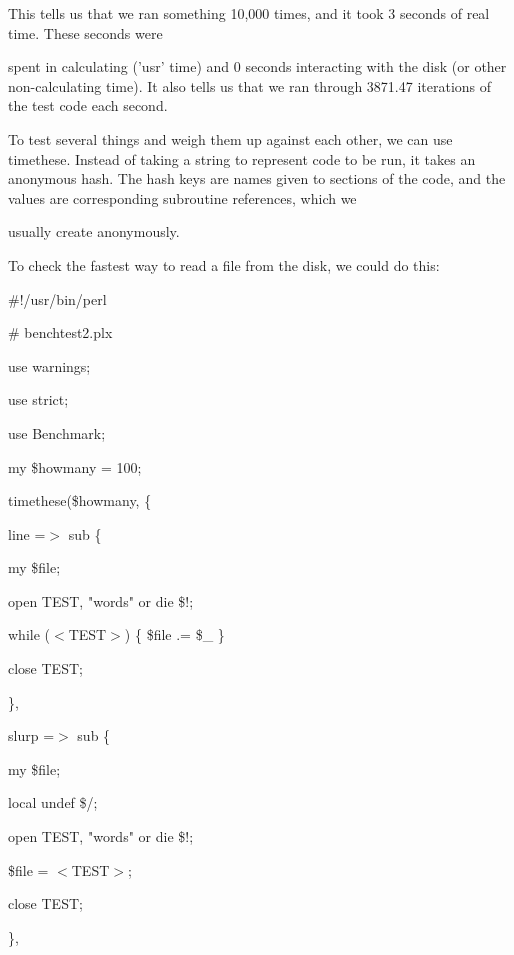 \documentclass[a4paper,11pt]{book}
\begin{document}
\noindent This tells us that we ran something 10,000 times, and it took 3 seconds of real time. These seconds were

 spent in calculating ('usr' time) and 0 seconds interacting with the disk (or other non-calculating time). It also tells us that we ran through 3871.47 iterations of the test code each second.

\noindent 

\noindent To test several things and weigh them up against each other, we can use timethese. Instead of taking a string to represent code to be run, it takes an anonymous hash. The hash keys are names given to sections of the code, and the values are corresponding subroutine references, which we

\noindent usually create anonymously.

\noindent 

\noindent To check the fastest way to read a file from the disk, we could do this:

\noindent 

\noindent \#!/usr/bin/perl

\noindent \# benchtest2.plx

\noindent use warnings;

\noindent use strict;

\noindent 

\noindent use Benchmark;

\noindent my \$howmany = 100;

\noindent 

\noindent timethese(\$howmany, \{

\noindent line =$>$ sub \{

\noindent my \$file;

\noindent open TEST, "words" or die \$!;

\noindent while ($<$TEST$>$) \{ \$file .= \$\_  \}

\noindent close TEST;

\noindent \},

\noindent slurp =$>$ sub \{

\noindent my \$file;

\noindent local undef \$/;

\noindent open TEST, "words" or die \$!;

\noindent \$file = $<$TEST$>$;

\noindent close TEST;

\noindent \},

\noindent 
\end{document}
